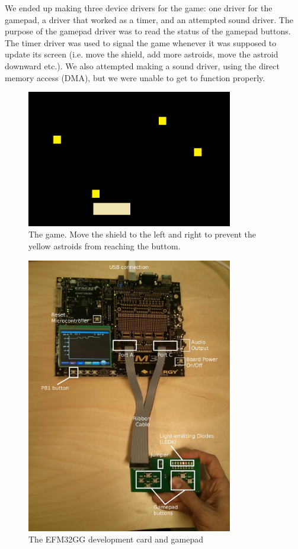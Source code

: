 We ended up making three device drivers for the game: one driver for the gamepad, a driver that worked as a timer, and an attempted sound driver. The purpose of the gamepad driver was to read the status of the gamepad buttons. The timer driver was used to signal the game whenever it was supposed to update its screen (i.e. move the shield, add more astroids, move the astroid downward etc.). We also attempted making a sound driver, using the direct memory access (DMA), but we were unable to get to function properly. 

\begin{figure}[ht]
    \centering
      \includegraphics[width=9cm]{figures/game}
    \caption{The game. Move the shield to the left and right to prevent the yellow astroids from reaching the buttom.}
    \label{figure_game}
\end{figure}
 


\begin{figure}[ht]
    \centering
      \includegraphics[width=9cm]{figures/efm32gg}
    \caption{The EFM32GG development card and gamepad\cite{compendium}}
    \label{figure_efm32gg}
\end{figure}
